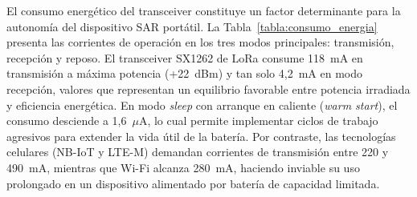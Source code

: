 El consumo energético del transceiver constituye un factor determinante para la autonomía del dispositivo SAR portátil. La Tabla~\ref{tabla:consumo_energia} presenta las corrientes de operación en los tres modos principales: transmisión, recepción y reposo. El transceiver SX1262 de LoRa consume 118~mA en transmisión a máxima potencia (+22~dBm) y tan solo 4,2~mA en modo recepción, valores que representan un equilibrio favorable entre potencia irradiada y eficiencia energética. En modo \textit{sleep} con arranque en caliente (\textit{warm start}), el consumo desciende a 1,6~$\mu$A, lo cual permite implementar ciclos de trabajo agresivos para extender la vida útil de la batería. Por contraste, las tecnologías celulares (NB-IoT y LTE-M) demandan corrientes de transmisión entre 220 y 490~mA, mientras que Wi-Fi alcanza 280~mA, haciendo inviable su uso prolongado en un dispositivo alimentado por batería de capacidad limitada.

\begin{table}[H]
\begin{center}
\caption{Consumo de corriente del transceiver en distintos modos de operación.}
\label{tabla:consumo_energia}
\end{center}
\end{table}


